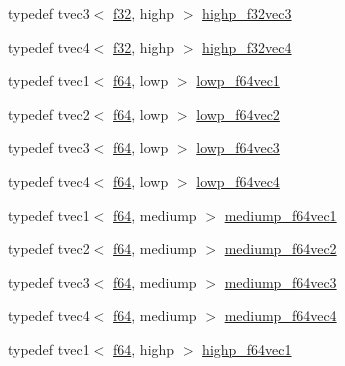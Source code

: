 \begin{DoxyCompactItemize}
\item 
typedef tvec3$<$ \hyperlink{group__gtc__type__precision_ga0ec999b57f5330d9021256e96038df04}{f32}, highp $>$ \hyperlink{namespaceglm_a23c60c992dfe341ba66054986f935278}{highp\+\_\+f32vec3}
\item 
typedef tvec4$<$ \hyperlink{group__gtc__type__precision_ga0ec999b57f5330d9021256e96038df04}{f32}, highp $>$ \hyperlink{namespaceglm_a55f76ea4dec80b99c68501af47db2eb1}{highp\+\_\+f32vec4}
\item 
typedef tvec1$<$ \hyperlink{group__gtc__type__precision_ga2bba392e555124b36cde6abba349bab3}{f64}, lowp $>$ \hyperlink{namespaceglm_a7072d075ab07dfb7c9a4a900e66b3a0d}{lowp\+\_\+f64vec1}
\item 
typedef tvec2$<$ \hyperlink{group__gtc__type__precision_ga2bba392e555124b36cde6abba349bab3}{f64}, lowp $>$ \hyperlink{namespaceglm_a480854bac14ae0e412e76604b52d82ac}{lowp\+\_\+f64vec2}
\item 
typedef tvec3$<$ \hyperlink{group__gtc__type__precision_ga2bba392e555124b36cde6abba349bab3}{f64}, lowp $>$ \hyperlink{namespaceglm_adc4bd8cc4f9c7cca810ca8655d276a2c}{lowp\+\_\+f64vec3}
\item 
typedef tvec4$<$ \hyperlink{group__gtc__type__precision_ga2bba392e555124b36cde6abba349bab3}{f64}, lowp $>$ \hyperlink{namespaceglm_a11fc85d24a8ea1cfae7a4b3f88e1644a}{lowp\+\_\+f64vec4}
\item 
typedef tvec1$<$ \hyperlink{group__gtc__type__precision_ga2bba392e555124b36cde6abba349bab3}{f64}, mediump $>$ \hyperlink{namespaceglm_a41bd76a5d92f591ee0cd9474a95a4b71}{mediump\+\_\+f64vec1}
\item 
typedef tvec2$<$ \hyperlink{group__gtc__type__precision_ga2bba392e555124b36cde6abba349bab3}{f64}, mediump $>$ \hyperlink{namespaceglm_aa99952ddefd80fff0e265598ee70df87}{mediump\+\_\+f64vec2}
\item 
typedef tvec3$<$ \hyperlink{group__gtc__type__precision_ga2bba392e555124b36cde6abba349bab3}{f64}, mediump $>$ \hyperlink{namespaceglm_aabebaae1dd08feb4ec42f282eeee57ab}{mediump\+\_\+f64vec3}
\item 
typedef tvec4$<$ \hyperlink{group__gtc__type__precision_ga2bba392e555124b36cde6abba349bab3}{f64}, mediump $>$ \hyperlink{namespaceglm_ae20b112098e50234ede09f15028b9749}{mediump\+\_\+f64vec4}
\item 
typedef tvec1$<$ \hyperlink{group__gtc__type__precision_ga2bba392e555124b36cde6abba349bab3}{f64}, highp $>$ \hyperlink{namespaceglm_ac123e65849952ae8d2bf29ac8b7ff651}{highp\+\_\+f64vec1}
\item 

\end{DoxyCompactItemize}
